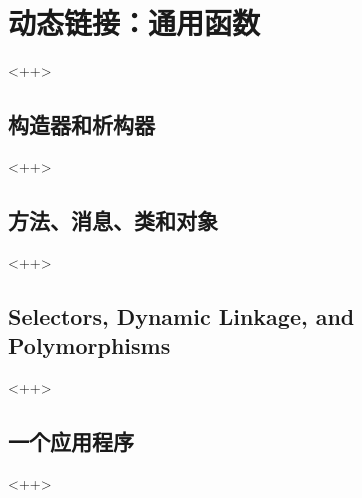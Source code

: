 

\chapter{动态链接：通用函数}
\label{ch:DynamicLinkage}
<++>

\section{构造器和析构器}<++>

\section{方法、消息、类和对象}<++>

\section{Selectors, Dynamic Linkage, and Polymorphisms}<++>

\section{一个应用程序}<++>

